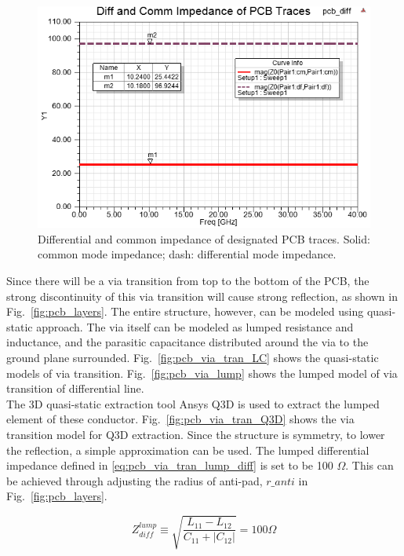 \documentclass{book}  %
\renewcommand{\subsection}[1]{\psubsection{#1}}
\begin{document}
\begin{paper}
\begin{figure}[htbp!]
	\centering
	\includegraphics[width=0.8\columnwidth]{./img/PCB/differential_PCB_2D_impedance.png}
	\caption{Differential and common impedance of designated PCB traces. Solid: common mode impedance; dash: differential mode impedance.}
	\label{fig:pcb_trace_impedance} %
\end{figure}


\subsection{Via Transition}
Since there will be a via transition from top to the bottom of the PCB, the strong discontinuity of this via transition will cause strong reflection, as shown in Fig.~\ref{fig:pcb_layers}. The entire structure, however, can be modeled using quasi-static approach. The via itself can be modeled as lumped resistance and inductance, and the parasitic capacitance distributed around the via to the ground plane surrounded. Fig.~\ref{fig:pcb_via_tran_LC} shows the quasi-static models of via transition. Fig.~\ref{fig:pcb_via_lump} shows the lumped model of via transition of differential line. \\

The 3D quasi-static extraction tool Ansys Q3D \cite{na_ansys_q3d} is used to extract the lumped element of these conductor. Fig.~\ref{fig:pcb_via_tran_Q3D} shows the via transition model for Q3D extraction. Since the structure is symmetry, to lower the reflection, a simple approximation can be used. The lumped differential impedance defined in \ref{eq:pcb_via_tran_lump_diff} is set to be 100 $\Omega$. This can be achieved through adjusting the radius of anti-pad, $r\_anti$ in Fig.~\ref{fig:pcb_layers}.

\begin{equation}\label{eq:pcb_via_tran_lump_diff}
Z^{lump}_{diff}\equiv \sqrt{\frac{L_{11} - L_{12}}{C_{11} + \left|C_{12}\right|}} = 100\Omega
\end{equation}


\end{paper}
\end{document}
